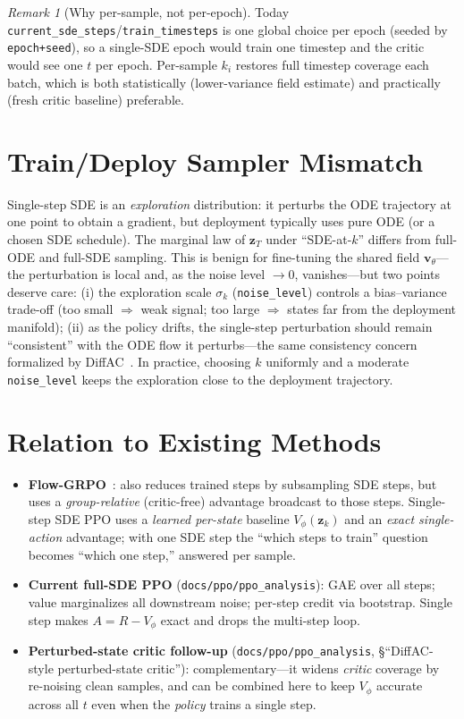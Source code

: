 \documentclass[11pt]{article}
\theoremstyle{plain}
\theoremstyle{remark}
\newtheorem{remark}{Remark}
\newcommand{\zt}{\bm{z}}
\newcommand{\Vphi}{V_\phi}
\begin{document}
\begin{remark}[Why per-sample, not per-epoch]
Today \texttt{current\_sde\_steps}/\texttt{train\_timesteps} is one global choice per
epoch (seeded by \texttt{epoch+seed}), so a single-SDE epoch would train one timestep and
the critic would see one $t$ per epoch. Per-sample $k_i$ restores full timestep coverage
each batch, which is both statistically (lower-variance field estimate) and practically
(fresh critic baseline) preferable.
\end{remark}

\section{Train/Deploy Sampler Mismatch}
\label{sec:traindeploy}

Single-step SDE is an \emph{exploration} distribution: it perturbs the ODE trajectory at
one point to obtain a gradient, but deployment typically uses pure ODE (or a chosen SDE
schedule). The marginal law of $\zt_T$ under ``SDE-at-$k$'' differs from full-ODE and
full-SDE sampling. This is benign for fine-tuning the shared field $\bm v_\theta$---the
perturbation is local and, as the noise level $\to0$, vanishes---but two points deserve
care: (i) the exploration scale $\sigma_k$ (\texttt{noise\_level}) controls a
bias--variance trade-off (too small $\Rightarrow$ weak signal; too large $\Rightarrow$
states far from the deployment manifold); (ii) as the policy drifts, the single-step
perturbation should remain ``consistent'' with the ODE flow it perturbs---the same
consistency concern formalized by DiffAC~\cite{zhou2024diffac}. In practice, choosing $k$
uniformly and a moderate \texttt{noise\_level} keeps the exploration close to the
deployment trajectory.

\section{Relation to Existing Methods}
\label{sec:relations}

\begin{itemize}[leftmargin=1.5em]
  \item \textbf{Flow-GRPO}~\cite{flowgrpo}: also reduces trained steps by subsampling SDE
  steps, but uses a \emph{group-relative} (critic-free) advantage broadcast to those
  steps. Single-step SDE PPO uses a \emph{learned per-state} baseline $\Vphi(\zt_k)$ and an
  \emph{exact single-action} advantage; with one SDE step the ``which steps to train''
  question becomes ``which one step,'' answered per sample.
  \item \textbf{Current full-SDE PPO} (\texttt{docs/ppo/ppo\_analysis}): GAE over all
  steps; value marginalizes all downstream noise; per-step credit via bootstrap. Single
  step makes $A=R-\Vphi$ exact and drops the multi-step loop.
  \item \textbf{Perturbed-state critic follow-up} (\texttt{docs/ppo/ppo\_analysis},
  \S``DiffAC-style perturbed-state critic''): complementary---it widens \emph{critic}
  coverage by re-noising clean samples, and can be combined here to keep $\Vphi$ accurate
  across all $t$ even when the \emph{policy} trains a single step.
\end{itemize}
\end{document}

